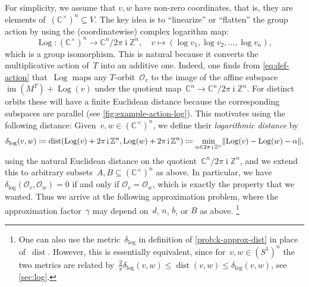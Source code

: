 \documentclass[10pt,a4paper]{article}
\theoremstyle{definition}
\DeclareMathOperator{\ii}{i}
\DeclareMathOperator{\Log}{Log}
\DeclareMathOperator{\dist}{dist}
\newcommand{\distLD}{\delta_{\log}}
\DeclareMathOperator{\ran}{im}
\newcommand{\CC}{\mathbb{C}}
\newcommand{\ZZ}{\mathbb{Z}}
\newcommand{\OO}{\ensuremath{\mathcal{O}}}
\DeclarePairedDelimiter\norm{\lVert}{\rVert}
\numberwithin{equation}{section}
\begin{document}
For simplicity, we assume that $v, w$ have non-zero coordinates, that is,
they are elements of~$(\CC^\times)^n \subseteq V$.
The key idea is to ``linearize'' or ``flatten'' the group action by using
the (coordinatewise) complex logarithm map:
\begin{equation}\label{eq:Log-def}
  \Log \colon (\CC^\times)^n \rightarrow \CC^n/2\pi\ii\ZZ^n,
  \quad
  v \mapsto (\log v_1, \log v_2,\dots, \log v_n) ,
\end{equation}
which is a group isomorphism.
This is natural because it converts the multiplicative action of~$T$ into an additive one. %
Indeed, one finds from \eqref{eq:def-action} that~$\Log$ maps any $T$-orbit~$\OO_v$ to
the image of the affine subspace~$\ran(M^T) + \Log(v)$ under the quotient map~$\CC^n \to \CC^{n}/2\pi\ii\ZZ^n$.
For distinct orbits these will have a finite Euclidean distance because
the corresponding subspaces are parallel (see \cref{fig:example-action-log}).
This motivates using the following distance:
Given~$v,w \in (\CC^\times)^n$, we define their \emph{logarithmic distance} by
\begin{equation}
\label{eq:def-distLD}
 \distLD(v,w)
\coloneqq \dist\mleft(\Log(v) + 2 \pi \ii \ZZ^n, \Log(w) + 2 \pi \ii \ZZ^n\mright)
\coloneqq \min_{\alpha \in 2 \pi \ii \ZZ^n} \norm{\Log(v) - \Log(w) - \alpha},
\end{equation}
using the natural Euclidean distance on the quotient~$\CC^{n}/2\pi\ii\ZZ^n$, and we extend this
to arbitrary subsets~$A,B\subseteq (\CC^\times)^n$ as above.
In particular, we have $\distLD(\OO_v,\OO_w)=0$ if and only if $\OO_v=\OO_w$, which is exactly the property that we wanted.
Thus we arrive at the following approximation problem, where the approximation factor~$\gamma$ may depend on~$d$, $n$, $b$, or $B$ as above.%
\footnote{\label{footnote:norm conversion} One can also use the metric~$\distLD$ in definition of \cref{prob:k-approx-dist} in place of~$\dist$. However, this is essentially equivalent, since for~$v,w\in(S^1)^n$ the two metrics are related by~$\frac2\pi \distLD(v,w) \leq \dist(v,w) \leq \distLD(v,w)$, see \cref{sec:log}.
}
\end{document}
